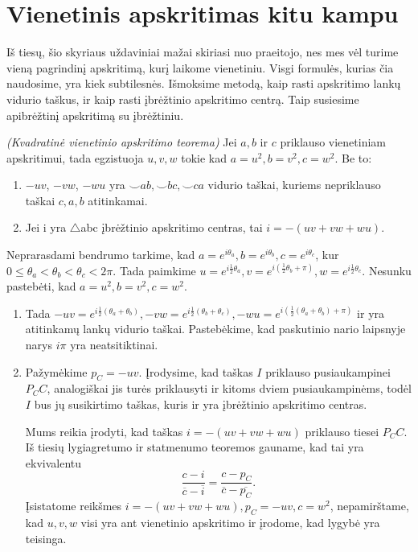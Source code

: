 \documentclass[11pt,a4paper,twoside]{book}
\begin{document}
\section{Vienetinis apskritimas kitu kampu}

Iš tiesų, šio skyriaus uždaviniai mažai skiriasi nuo praeitojo, nes mes vėl turime vieną pagrindinį apskritimą, kurį laikome vienetiniu. Visgi formulės, kurias čia naudosime, yra kiek subtilesnės. Išmoksime metodą, kaip rasti apskritimo lankų vidurio taškus, ir kaip rasti įbrėžtinio apskritimo centrą. Taip susiesime apibrėžtinį apskritimą su įbrėžtiniu.

\begin{thmnr} \textit{(Kvadratinė vienetinio apskritimo teorema)} Jei $a, b$ ir $c$ priklauso vienetiniam apskritimui, tada egzistuoja $u, v, w$ tokie kad $a=u^2, b=v^2, c=w^2$. Be to:\
\begin{enumerate}
\item $-uv$, $-vw$, $-wu$ yra $\smile ab, \smile bc, \smile ca$ vidurio taškai, kuriems nepriklauso taškai $c, a, b$ atitinkamai.
\item Jei i yra $\bigtriangleup$abc įbrėžtinio apskritimo centras, tai $i= - (uv + vw + wu)$.
\end{enumerate}
\end{thmnr}

\begin{sprendimas}
Neprarasdami bendrumo tarkime, kad $a=e^{i\theta_a}, b=e^{i\theta_b}, c=e^{i\theta_c}$, kur $0 \leq \theta_a < \theta_b < \theta_c < 2\pi$. Tada paimkime $u=e^{i\frac{1}{2}\theta_a}, v=e^{i(\frac{1}{2}\theta_b+\pi)}, w=e^{i\frac{1}{2}\theta_c}$. Nesunku pastebėti, kad $a=u^{2}, b=v^{2}, c=w^{2}$.

\begin{enumerate}
\item Tada $-uv=e^{i\frac{1}{2}(\theta_a+\theta_b)}, -vw=e^{i\frac{1}{2}(\theta_b+\theta_c)}, -wu=e^{i(\frac{1}{2}(\theta_a+\theta_b)+\pi)}$ ir yra atitinkamų lankų vidurio taškai. Pastebėkime, kad paskutinio nario laipsnyje narys $i\pi$ yra neatsitiktinai.
\item Pažymėkime $p_C=-uv$. Įrodysime, kad taškas $I$ priklauso pusiaukampinei $P_CC$, analogiškai jis turės priklausyti ir kitoms dviem pusiaukampinėms, todėl $I$ bus jų susikirtimo taškas, kuris ir yra įbrėžtinio apskritimo centras.

Mums reikia įrodyti, kad taškas $i=-(uv+vw+wu)$ priklauso tiesei $P_CC$. Iš tiesių lygiagretumo ir statmenumo teoremos gauname, kad tai yra ekvivalentu $$\frac{c-i}{\overline c - \overline i}=\frac{c-p_C}{\overline {c} - \overline {p_C}}.$$
Įsistatome reikšmes $i=-(uv+vw+wu), p_C=-uv, c=w^2$, nepamirštame, kad $u, v, w$ visi yra ant vienetinio apskritimo ir įrodome, kad lygybė yra teisinga.
\end{enumerate}
\end{sprendimas}
\end{document}
